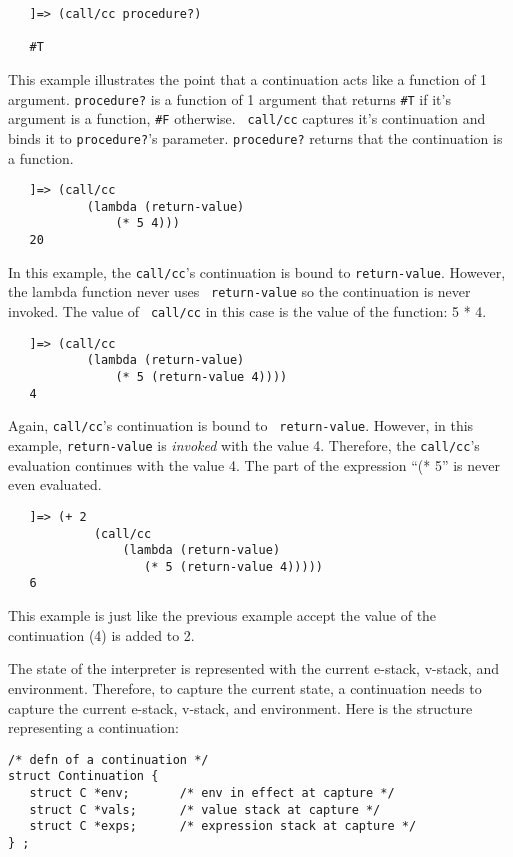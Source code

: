\begin{verbatim}
   ]=> (call/cc procedure?)

   #T
\end{verbatim}

	This example illustrates the point that a continuation acts like a
function of 1 argument.  {\tt procedure?} is a function of 1 argument that
returns {\tt #T} if it's argument is a function, {\tt #F} otherwise.  {\tt
call/cc} captures it's continuation and binds it to {\tt procedure?}'s
parameter.  {\tt procedure?} returns that the continuation is a function.

\begin{verbatim}
   ]=> (call/cc
           (lambda (return-value)
               (* 5 4)))
   20
\end{verbatim}

	In this example, the {\tt call/cc}'s continuation is bound to
{\tt return-value}.  However, the lambda function never uses {\tt
return-value} so the continuation is never invoked.  The value of {\tt
call/cc} in this case is the value of the function: 5 * 4.

\begin{verbatim}
   ]=> (call/cc
           (lambda (return-value)
               (* 5 (return-value 4))))
   4
\end{verbatim}

	Again, {\tt call/cc}'s continuation is bound to {\tt
return-value}.  However, in this example, {\tt return-value} is {\em
invoked} with the value 4.  Therefore, the {\tt call/cc}'s evaluation
continues with the value 4.  The part of the expression ``(* 5'' is never
even evaluated.

\begin{verbatim}
   ]=> (+ 2
            (call/cc
                (lambda (return-value)
                   (* 5 (return-value 4)))))
   6
\end{verbatim}

	This example is just like the previous example accept the value
of the continuation (4) is added to 2.

	The state of the interpreter is represented with the current
e-stack, v-stack, and environment.  Therefore, to capture the current
state, a continuation needs to capture the current e-stack, v-stack, and
environment.  Here is the structure representing a continuation:

\begin{verbatim}
/* defn of a continuation */
struct Continuation {
   struct C *env;       /* env in effect at capture */
   struct C *vals;      /* value stack at capture */
   struct C *exps;      /* expression stack at capture */
} ;
\end{verbatim}

